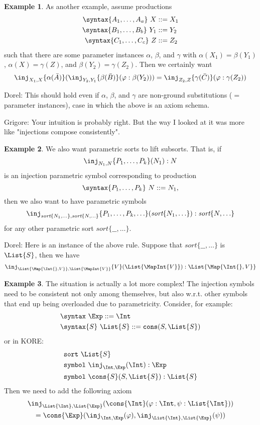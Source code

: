 \documentclass{article}
\newcommand\comment[2]{\par\noindent\color{red}#1: #2\color{black}\par\noindent}
\newcommand\dl{\comment{Dorel}}
\newcommand\gr{\comment{Grigore}}
\theoremstyle{definition}
\newtheorem{example}{Example}[section]
\theoremstyle{definition}
\theoremstyle{definition}
\theoremstyle{definition}
\theoremstyle{definition}
\theoremstyle{theorem}
\theoremstyle{theorem}
\theoremstyle{theorem}
\theoremstyle{theorem}
\theoremstyle{theorem}
\newcommand{\Sort}[1]{\textit{sort}\{#1\}}
\newcommand{\KWsymbol}{\texttt{symbol}}
\newcommand{\sort}{\texttt{sort}}
\begin{document}
\begin{example}\label{consistency-compose}
As another example, assume productions
\begin{align*}
\syntax\{A_1,\ldots,A_a\}\ X & ::=X_1\\
\syntax\{B_1,\ldots,B_b\}\ Y_1 & ::=Y_2\\
\syntax\{C_1,\ldots,C_c\}\ Z & ::=Z_2\\
\end{align*}
such that there are some parameter instances
\(\alpha\), \(\beta\), and \(\gamma\) with
\(\alpha(X_1) = \beta(Y_1)\), \(\alpha(X) = \gamma(Z)\),
and \(\beta(Y_2) = \gamma(Z_2)\).
Then we certainly want
\[\inj_{X_1,X}\{\alpha(\bar{A})\}(
  \inj_{Y_2,Y_1}\{\beta(\bar{B})\}(\varphi:\beta(Y_2)))
 = \inj_{Z_2,Z}\{\gamma(\bar{C})\}(\varphi:\gamma(Z_2))\]
\dl{This should hold even if $\alpha$, $\beta$, and $\gamma$ are non-ground substitutions ($=$ parameter instances), case in which the above is an axiom schema.}
\gr{Your intuition is probably right.  But the way I looked at it was more like "injections compose consistently".}
\end{example}

\begin{example}\label{consistency-lifting}
We also want parametric sorts to lift subsorts.
That is, if
\[\inj_{N_1,N}\{P_1,\ldots,P_k\}(N_1):N\]
is an injection parametric symbol corresponding to production
\[\syntax\{P_1,\ldots,P_k\}\ N::=N_1,\]
then we also want to have parametric symbols
\[\inj_{\Sort{N_1,\ldots},\Sort{N,\ldots}}
   \{P_1,\ldots,P_k,\ldots\}
    (\Sort{N_1,\ldots}) : \Sort{N,\ldots}\]
for any other parametric sort \(\Sort{\_\!\_,\ldots}\).
\dl{Here is an instance of the above rule. Suppose that \(\Sort{\_\!\_,\ldots}\) is
$\List{S}$, then we have
\[\inj_{\List{\Map{\Int\{\},V}},\List{\MapInt{V}}}\{V\}(\List{\MapInt{V}}):\List{\Map{\Int\{\},V}}\] 
}
\end{example}

\begin{example}\label{consistency-parametric}
The situation is actually a lot more complex!
The injection symbols need to be consistent not only among
themselves, but also w.r.t. other symbols that end up
being overloaded due to parametricity.
Consider, for example:
\begin{align*}
&\syntax\ \Exp::=\Int\\
&\syntax\{S\}\ \List{S}::=\texttt{cons}(S,\List{S})
\end{align*}
or in KORE:
\begin{align*}
&\sort\ \List{S}\\
&\KWsymbol\ \inj_{\Int,\Exp}(\Int):\Exp\\
&\KWsymbol\ \cons{S}(S,\List{S}):\List{S}
\end{align*}
Then we need to add the following axiom
\begin{multline*}
\inj_{\List{\Int},\List{\Exp}}(\cons{\Int}(\varphi:\Int,\psi:\List{\Int})) \\
 = \cons{\Exp}(\inj_{\Int,\Exp}(\varphi),\inj_{\List{\Int},\List{\Exp}}(\psi))
\end{multline*}
\end{example}
\end{document}

